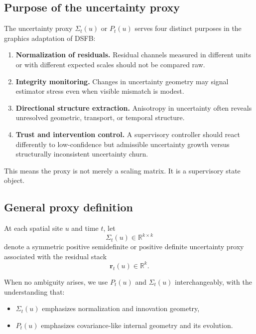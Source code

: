 \documentclass[11pt]{article}
\theoremstyle{definition}
\theoremstyle{plain}
\begin{document}

\subsection{Purpose of the uncertainty proxy}

The uncertainty proxy $\Sigma_t(u)$ or $P_t(u)$ serves four distinct purposes in the graphics adaptation of DSFB:

\begin{enumerate}[leftmargin=1.5em]
    \item \textbf{Normalization of residuals.} Residual channels measured in different units or with different expected scales should not be compared raw.
    \item \textbf{Integrity monitoring.} Changes in uncertainty geometry may signal estimator stress even when visible mismatch is modest.
    \item \textbf{Directional structure extraction.} Anisotropy in uncertainty often reveals unresolved geometric, transport, or temporal structure.
    \item \textbf{Trust and intervention control.} A supervisory controller should react differently to low-confidence but admissible uncertainty growth versus structurally inconsistent uncertainty churn.
\end{enumerate}

This means the proxy is not merely a scaling matrix. It is a supervisory state object.


\subsection{General proxy definition}

At each spatial site $u$ and time $t$, let
\begin{equation}
\Sigma_t(u)\in\mathbb{R}^{k\times k}
\end{equation}
denote a symmetric positive semidefinite or positive definite uncertainty proxy associated with the residual stack
\begin{equation}
\mathbf r_t(u)\in\mathbb{R}^k.
\end{equation}

When no ambiguity arises, we use $P_t(u)$ and $\Sigma_t(u)$ interchangeably, with the understanding that:
\begin{itemize}[leftmargin=1.5em]
    \item $\Sigma_t(u)$ emphasizes normalization and innovation geometry,
    \item $P_t(u)$ emphasizes covariance-like internal geometry and its evolution.
\end{itemize}
\end{document}
